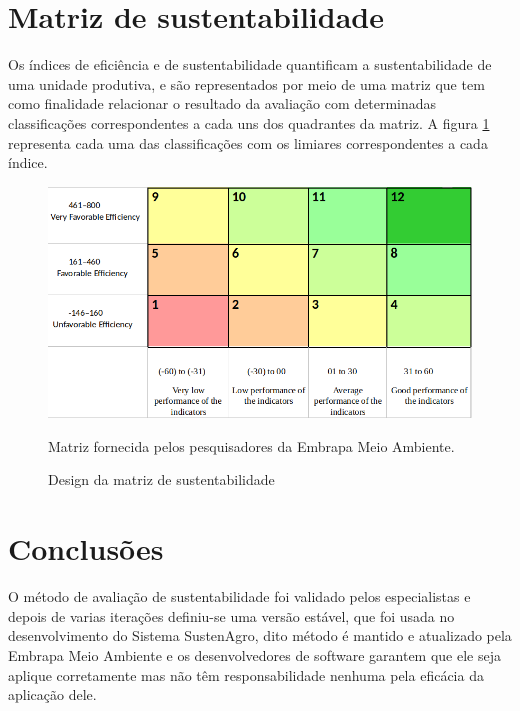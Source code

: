 \section{Matriz de sustentabilidade}

Os índices de eficiência e de sustentabilidade quantificam a sustentabilidade
de uma unidade produtiva, e são representados por meio de uma matriz
que tem como finalidade relacionar o resultado da avaliação com determinadas
classificações correspondentes a cada uns dos quadrantes da matriz.
A figura \ref{fig:Matriz-de-sustentabilidade} representa cada uma
das classificações com os limiares correspondentes a cada índice.

\begin{figure}[H]
\includegraphics[width=0.8\columnwidth]{figures/SustaiabilityMatrixDesign}

\caption{Design da matriz de sustentabilidade \label{fig:Matriz-de-sustentabilidade}}

Matriz fornecida pelos pesquisadores da Embrapa Meio Ambiente.

\end{figure}


\section{Conclusões}

O método de avaliação de sustentabilidade foi validado pelos especialistas
e depois de varias iterações definiu-se uma versão estável, que foi
usada no desenvolvimento do Sistema SustenAgro, dito método é mantido
e atualizado pela Embrapa Meio Ambiente e os desenvolvedores de software
garantem que ele seja aplique corretamente mas não têm responsabilidade
nenhuma pela eficácia da aplicação dele.
